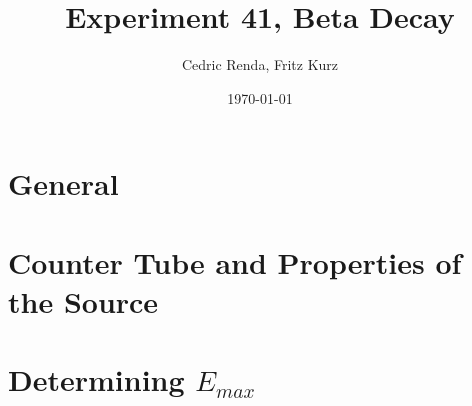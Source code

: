 \documentclass[12pt,a4paper]{article}
\title{Experiment 41, Beta Decay}
\author{Cedric Renda, Fritz Kurz}
\date{\today }
\begin{document}
\maketitle




\tableofcontents
\section{General}



\section{Counter Tube and Properties of the Source}





\section{Determining $E_{max}$}






%

\newpage

\end{document}
